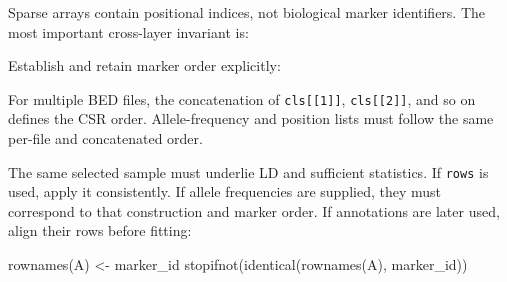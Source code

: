 \documentclass[
  11pt,
  letterpaper,
  DIV=11,
  numbers=noendperiod]{scrartcl}
\newenvironment{Shaded}{\begin{snugshade}}{\end{snugshade}}
\newcommand{\FunctionTok}[1]{\textcolor[rgb]{0.39,0.29,0.61}{#1}}
\newcommand{\NormalTok}[1]{\textcolor[rgb]{0.12,0.11,0.11}{#1}}
\newcommand{\OtherTok}[1]{\textcolor[rgb]{0.00,0.43,0.16}{#1}}
\newcommand{\SpecialCharTok}[1]{\textcolor[rgb]{0.24,0.68,0.91}{#1}}
\begin{document}
Sparse arrays contain positional indices, not biological marker
identifiers. The most important cross-layer invariant is:

\begin{Shaded}
\end{Shaded}

Establish and retain marker order explicitly:

\begin{Shaded}
\end{Shaded}

For multiple BED files, the concatenation of \texttt{cls{[}{[}1{]}{]}},
\texttt{cls{[}{[}2{]}{]}}, and so on defines the CSR order.
Allele-frequency and position lists must follow the same per-file and
concatenated order.

The same selected sample must underlie LD and sufficient statistics. If
\texttt{rows} is used, apply it consistently. If allele frequencies are
supplied, they must correspond to that construction and marker order. If
annotations are later used, align their rows before fitting:

\begin{Shaded}
\begin{Highlighting}[]
\FunctionTok{rownames}\NormalTok{(A) }\OtherTok{\textless{}{-}}\NormalTok{ marker\_id}
\FunctionTok{stopifnot}\NormalTok{(}\FunctionTok{identical}\NormalTok{(}\FunctionTok{rownames}\NormalTok{(A), marker\_id))}
\end{Highlighting}
\end{Shaded}
\end{document}
